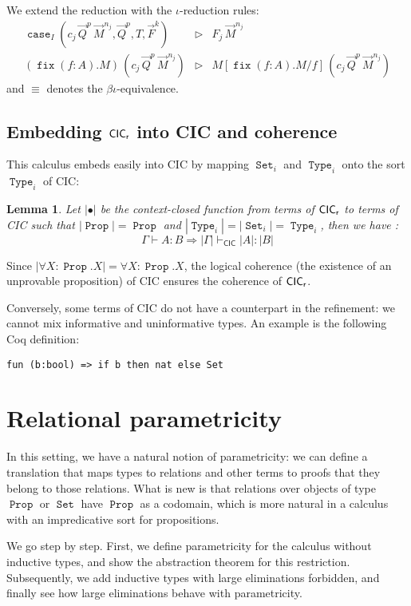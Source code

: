 \documentclass[a4paper,USenglish]{lipics}
\newtheorem{lem}{Lemma}
\DeclareMathOperator{\Prop}{\mathtt{Prop}}
\DeclareMathOperator{\Type}{\mathtt{Type}}
\DeclareMathOperator{\Set}{\mathtt{Set}}
\DeclareMathOperator{\case}{\mathtt{case}}
\DeclareMathOperator{\fix}{\mathtt{fix}}
\def\coq{\textsf{Coq}\xspace}
\def\cic{\textsf{CIC}\xspace}
\def\cicr{$\text{\textsf{CIC}}_{\text{\textsf{r}}}$\xspace}
\newcommand{\arrlong}[1]{\overrightarrow{#1}}
\newcommand\arn[2]{
{\arrlong{#1}}^{#2}
}
\begin{document}
We extend the reduction with the $\iota$-reduction rules:
\begin{equation*}
\begin{array}{rcl}
\case_I(c_j\,\arn{Q}{p}\,\arn{M}{n_j}, \arn{Q}{p}, T, \arn{F}{k})
& \rhd & F_j\,\arn{M}{n_j}\\
(\fix (f:A).M)\,(c_j\,\arn{Q}{p}\,\arn{M}{n_j}) & \rhd & M[\fix (f:A).M/f]\,(c_j\,\arn{Q}{p}\,\arn{M}{n_j})
\end{array}
\end{equation*}
and $\equiv$ denotes the $\beta\iota$-equivalence.

\subsection{Embedding \cicr into \cic and coherence}

This calculus embeds easily into \cic by mapping $\Set_i$ and $\Type_i$
onto the sort $\Type_i$ of \cic:
\begin{lem}
Let $|\bullet|$ be the context-closed function from terms of \cicr to terms
of \cic such that $|\Prop| = \Prop$ and $|\Type_i| = |\Set_i| = \Type_i$, then
we have :
$$Γ ⊢ A : B ⇒  |Γ| ⊢_{\cic} |A| : |B|$$
\end{lem}
Since $|∀X:\Prop.X|=∀X:\Prop.X$, the logical coherence (the existence of an
unprovable proposition) of \cic ensures the coherence of \cicr.

Conversely, some terms of \cic do not have a counterpart in the
refinement: we cannot mix informative and uninformative types. An
example is the following \coq definition:
\begin{lstlisting}
fun (b:bool) => if b then nat else Set
\end{lstlisting}


\section{Relational parametricity}\label{sec:parametricity}

In this setting, we have a natural notion of parametricity: we can
define a translation that maps types to relations and other terms to
proofs that they belong to those relations. What is new is that
relations over objects of type $\Prop$ or $\Set$ have $\Prop$ as a
codomain, which is more natural in a calculus with an impredicative sort
for propositions.

We go step by step. First, we define parametricity for the calculus
without inductive types, and show the abstraction theorem for this
restriction. Subsequently, we add inductive types with large
eliminations forbidden, and finally see how large eliminations behave
with parametricity.
\end{document}
